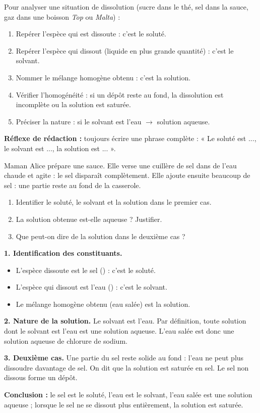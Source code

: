 \documentclass[11pt]{article}
\newcommand{\cle}[1]{{\popxbold\color{popdark}#1}}
\begin{document}
\begin{methode}
Pour analyser une situation de dissolution (sucre dans le thé, sel dans la sauce, gaz dans une boisson \emph{Top} ou \emph{Malta}) :
\begin{enumerate}
\item Repérer l'espèce qui est \cle{dissoute} : c'est le \cle{soluté}.
\item Repérer l'espèce qui \cle{dissout} (liquide en plus grande quantité) : c'est le \cle{solvant}.
\item Nommer le mélange homogène obtenu : c'est la \cle{solution}.
\item Vérifier l'homogénéité : si un dépôt reste au fond, la dissolution est incomplète ou la solution est \cle{saturée}.
\item Préciser la nature : si le solvant est l'eau $\rightarrow$ \cle{solution aqueuse}.
\end{enumerate}
\textbf{Réflexe de rédaction :} toujours écrire une phrase complète : « Le soluté est ..., le solvant est ..., la solution est ... ».
\end{methode}

\begin{exoresolu}
Maman Alice prépare une sauce. Elle verse une cuillère de sel dans de l'eau chaude et agite : le sel disparaît complètement. Elle ajoute ensuite beaucoup de sel : une partie reste au fond de la casserole.
\begin{enumerate}
\item Identifier le soluté, le solvant et la solution dans le premier cas.
\item La solution obtenue est-elle aqueuse ? Justifier.
\item Que peut-on dire de la solution dans le deuxième cas ?
\end{enumerate}
\tcblower
\textbf{1. Identification des constituants.}
\begin{itemize}
\item L'espèce dissoute est le sel () : c'est le \cle{soluté}.
\item L'espèce qui dissout est l'eau () : c'est le \cle{solvant}.
\item Le mélange homogène obtenu (eau salée) est la \cle{solution}.
\end{itemize}

\textbf{2. Nature de la solution.} Le solvant est l'eau. Par définition, toute solution dont le solvant est l'eau est une \cle{solution aqueuse}. L'eau salée est donc une solution aqueuse de chlorure de sodium.

\textbf{3. Deuxième cas.} Une partie du sel reste solide au fond : l'eau ne peut plus dissoudre davantage de sel. On dit que la solution est \cle{saturée} en sel. Le sel non dissous forme un \cle{dépôt}.

\textbf{Conclusion :} le sel est le soluté, l'eau est le solvant, l'eau salée est une solution aqueuse ; lorsque le sel ne se dissout plus entièrement, la solution est saturée.
\end{exoresolu}
\end{document}
